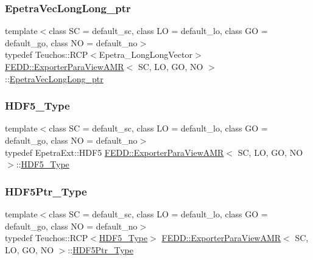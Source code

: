 \subsubsection{\texorpdfstring{Epetra\+Vec\+Long\+Long\+\_\+ptr}{EpetraVecLongLong\_ptr}}
{\footnotesize\ttfamily template$<$class SC  = default\+\_\+sc, class LO  = default\+\_\+lo, class GO  = default\+\_\+go, class NO  = default\+\_\+no$>$ \\
typedef Teuchos\+::\+R\+CP$<$Epetra\+\_\+\+Long\+Long\+Vector$>$ \hyperlink{classFEDD_1_1ExporterParaViewAMR}{F\+E\+D\+D\+::\+Exporter\+Para\+View\+A\+MR}$<$ SC, LO, GO, NO $>$\+::\hyperlink{classFEDD_1_1ExporterParaViewAMR_aefdbeefcdd8ef6c5a441cc6d964aea59}{Epetra\+Vec\+Long\+Long\+\_\+ptr}}

\mbox{\label{classFEDD_1_1ExporterParaViewAMR_a8fb291b4121b12ae97c3e1e2f7fb0200}} 
\subsubsection{\texorpdfstring{H\+D\+F5\+\_\+\+Type}{HDF5\_Type}}
{\footnotesize\ttfamily template$<$class SC  = default\+\_\+sc, class LO  = default\+\_\+lo, class GO  = default\+\_\+go, class NO  = default\+\_\+no$>$ \\
typedef Epetra\+Ext\+::\+H\+D\+F5 \hyperlink{classFEDD_1_1ExporterParaViewAMR}{F\+E\+D\+D\+::\+Exporter\+Para\+View\+A\+MR}$<$ SC, LO, GO, NO $>$\+::\hyperlink{classFEDD_1_1ExporterParaViewAMR_a8fb291b4121b12ae97c3e1e2f7fb0200}{H\+D\+F5\+\_\+\+Type}}

\mbox{\label{classFEDD_1_1ExporterParaViewAMR_aaf76d7e242edf55a27da762fb8c75bc6}} 
\subsubsection{\texorpdfstring{H\+D\+F5\+Ptr\+\_\+\+Type}{HDF5Ptr\_Type}}
{\footnotesize\ttfamily template$<$class SC  = default\+\_\+sc, class LO  = default\+\_\+lo, class GO  = default\+\_\+go, class NO  = default\+\_\+no$>$ \\
typedef Teuchos\+::\+R\+CP$<$\hyperlink{classFEDD_1_1ExporterParaViewAMR_a8fb291b4121b12ae97c3e1e2f7fb0200}{H\+D\+F5\+\_\+\+Type}$>$ \hyperlink{classFEDD_1_1ExporterParaViewAMR}{F\+E\+D\+D\+::\+Exporter\+Para\+View\+A\+MR}$<$ SC, LO, GO, NO $>$\+::\hyperlink{classFEDD_1_1ExporterParaViewAMR_aaf76d7e242edf55a27da762fb8c75bc6}{H\+D\+F5\+Ptr\+\_\+\+Type}}


